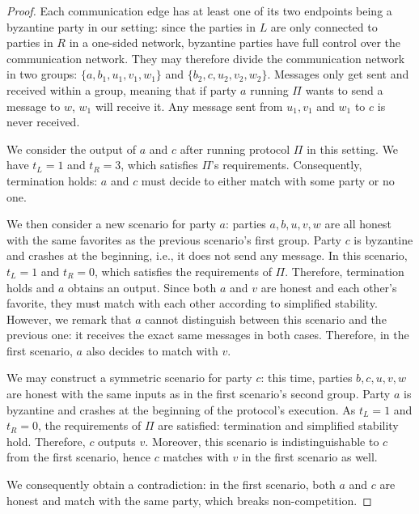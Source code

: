 \begin{proof}

Each communication edge has at least one of its two endpoints being a byzantine party in our setting: since the parties in $L$ are only connected to parties in $R$ in a one-sided network, byzantine parties have full control over the communication network. They may therefore divide the communication network in two groups: $\{a,b_1, u_1, v_1, w_1\}$ and $\{b_2, c, u_2, v_2, w_2\}$.
Messages only get sent and received within a group, meaning that if party $a$ running $\Pi$ wants to send a message to $w$, $w_1$ will receive it. Any message sent from $u_1, v_1$ and $w_1$ to $c$ is never received. 

We consider the output of $a$ and $c$ after running protocol $\Pi$ in this setting. We have $t_L = 1$ and $t_R = 3$, which satisfies $\Pi$'s requirements. Consequently, termination holds: $a$ and $c$ must decide to either match with some party or no one.

We then consider a new scenario for party $a$: parties $a, b, u, v, w$ are all honest with the same favorites as the previous scenario's first group. Party $c$ is byzantine and crashes at the beginning, i.e., it does not send any message. In this scenario, $t_L = 1$ and $t_R = 0$, which satisfies the requirements of $\Pi$. Therefore, termination holds and $a$ obtains an output. Since both $a$ and $v$ are honest and each other's favorite, they must match with each other according to simplified stability. However, we remark that $a$ cannot distinguish between this scenario and the previous one: it receives the exact same messages in both cases. Therefore, in the first scenario, $a$ also decides to match with $v$.

We may construct a symmetric scenario for party $c$: this time, parties $b, c, u, v, w$ are honest with the same inputs as in the first scenario's second group. Party $a$ is byzantine and crashes at the beginning of the protocol's execution. As $t_L = 1$ and $t_R = 0$, the requirements of $\Pi$ are satisfied: termination and simplified stability hold. Therefore, $c$ outputs $v$. Moreover, this scenario is indistinguishable to $c$ from the first scenario, hence $c$ matches with $v$ in the first scenario as well.


We consequently obtain a contradiction: in the first scenario, both $a$ and $c$ are honest and match with the same party, which breaks non-competition.
\end{proof}

